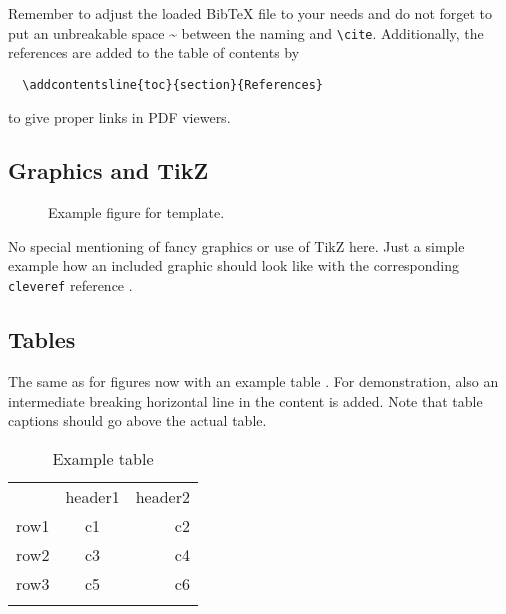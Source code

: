 \documentclass[%
  a4paper,
  twocolumn,
  algotwoe,
]{preprint}
\begin{document}
Remember to adjust the loaded BibTeX file to your needs and do not forget to
put an unbreakable space \~{} between the naming and \verb|\cite|.
Additionally, the references are added to the table of contents by
\begin{verbatim}
  \addcontentsline{toc}{section}{References}
\end{verbatim}
to give proper links in PDF viewers.


\subsection{Graphics and TikZ}%
\label{subsec:graphics}

\begin{figure}[t]
  \centering
   
  \caption{Example figure for template.}
  \label{fig:example}
\end{figure}

No special mentioning of fancy graphics or use of TikZ here.
Just a simple example how an included graphic should look like with the 
corresponding \verb|cleveref| reference .



\subsection{Tables}%
\label{subsec:tables}

The same as for figures now with an example table .
For demonstration, also an intermediate breaking horizontal line in the content 
is added.
Note that table captions should go above the actual table.

\begin{table}[t]
  \centering
  \caption{Example table}
  \label{tab:example}
  
  \begin{tabular}{lcr}
    \hline\noalign{\medskip}
    & header1 & header2\\
    \noalign{\smallskip}\hline\noalign{\medskip}
    row1 & c1 & c2 \\
    row2 & c3 & c4 \\
    \noalign{\smallskip}\hline\noalign{\medskip}
    row3 & c5 & c6 \\
    \noalign{\medskip}\hline\noalign{\smallskip}
  \end{tabular}
\end{table}
\end{document}
